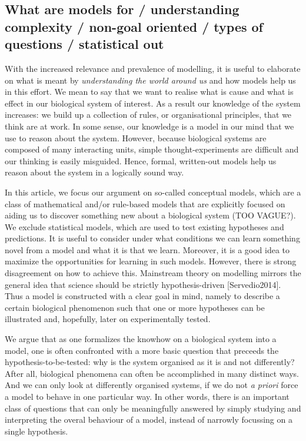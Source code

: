 \subsection{What are models for / understanding complexity / non-goal oriented / types of questions / statistical out}

With the increased relevance and prevalence of modelling, it is useful to elaborate on what is meant by \emph{understanding the world around us} and how models help us in this effort. We mean to say that we want to realise what is cause and what is effect in our biological system of interest. As a result our knowledge of the system increases: we build up a collection of rules, or organisational principles, that we think are at work. In some sense, our knowledge is a model in our mind that we use to reason about the system. However, because biological systems are composed of many interacting units, simple thought-experiments are difficult and our thinking is easily misguided. Hence, formal, written-out models help us reason about the system in a logically sound way.

In this article, we focus our argument on so-called conceptual models, which are a class of mathematical and/or rule-based models that are explicitly focused on aiding us to discover something new about a biological system (TOO VAGUE?). We exclude statistical models, which are used to test existing hypotheses and predictions. It is useful to consider under what conditions we can learn something novel from a model and what it is that we learn. Moreover, it is a good idea to maximize the opportunities for learning in such models. However, there is strong disagreement on how to achieve this. Mainstream theory on modelling mirrors the general idea that science should be strictly hypothesis-driven [Servedio2014]. Thus a model is constructed with a clear goal in mind, namely to describe a certain biological phenomenon such that one or more hypotheses can be illustrated and, hopefully, later on experimentally tested.

We argue that as one formalizes the knowhow on a biological system into a model, one is often confronted with a more basic question that preceeds the hypothesis-to-be-tested: why is the system organised as it is and not differently? After all, biological phenomena can often be accomplished in many distinct ways. And we can only look at differently organised systems, if we do not \emph{a priori} force a model to behave in one particular way. In other words, there is an important class of questions that can only be meaningfully answered by simply studying and interpreting the overal behaviour of a model, instead of narrowly focussing on a single hypothesis.
